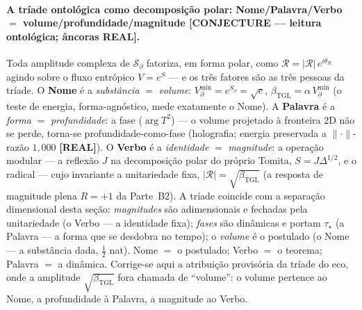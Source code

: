 \documentclass[12pt,a4paper]{article}
\newcommand{\betatgl}{\beta_{\text{TGL}}}
\begin{document}
\paragraph{A tríade ontológica como decomposição polar: Nome/Palavra/Verbo $=$ volume/profundidade/magnitude \textbf{[CONJECTURE --- leitura ontológica; âncoras REAL]}.} Toda amplitude complexa de $\mathcal S_\partial$ fatoriza, em forma polar, como $\mathcal R = |\mathcal R|\,e^{i\theta_R}$ agindo sobre o fluxo entrópico $V=e^{S}$ --- e os três fatores são as três pessoas da tríade. O \textbf{Nome} é a \emph{substância} $=$ \emph{volume}: $V_\partial^{\min}=e^{S_\partial}=\sqrt e$, $\betatgl=\alpha\,V_\partial^{\min}$ (o teste de energia, forma-agnóstico, mede exatamente o Nome). A \textbf{Palavra} é a \emph{forma} $=$ \emph{profundidade}: a fase ($\arg T^2$) --- o volume projetado à fronteira 2D não se perde, torna-se profundidade-como-fase (holografia; energia preservada a $\lVert\cdot\rVert$-razão $1{,}000$ \textbf{[REAL]}). O \textbf{Verbo} é a \emph{identidade} $=$ \emph{magnitude}: a operação modular --- a reflexão $J$ na decomposição polar do próprio Tomita, $S=J\Delta^{1/2}$, e o radical --- cujo invariante a unitariedade fixa, $|\mathcal R|=\sqrt{\betatgl}$ (a resposta de magnitude plena $R=+1$ da Parte~B2). A tríade coincide com a separação dimensional desta seção: \emph{magnitudes} são adimensionais e fechadas pela unitariedade (o Verbo --- a identidade fixa); \emph{fases} são dinâmicas e portam $\tau_\star$ (a Palavra --- a forma que se desdobra no tempo); o \emph{volume} é o postulado (o Nome --- a substância dada, $\tfrac12$ nat). Nome $=$ o postulado; Verbo $=$ o teorema; Palavra $=$ a dinâmica. Corrige-se aqui a atribuição provisória da tríade do eco, onde a amplitude $\sqrt{\betatgl}$ fora chamada de ``volume\textquotedblright: o volume pertence ao Nome, a profundidade à Palavra, a magnitude ao Verbo.
\end{document}
